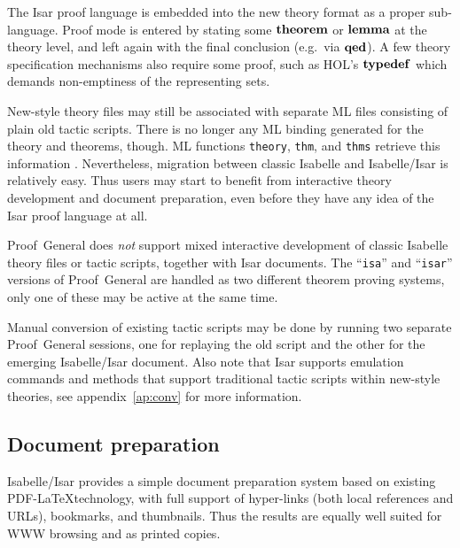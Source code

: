 The Isar proof language is embedded into the new theory format as a proper
sub-language.  Proof mode is entered by stating some ${\mathord{\mathbf{theorem}}}$ or
${\mathord{\mathbf{lemma}}}$ at the theory level, and left again with the final conclusion
(e.g.\ via ${\mathord{\mathbf{qed}}}$).  A few theory specification mechanisms also require
some proof, such as HOL's ${\mathord{\mathbf{typedef}}}$ which demands non-emptiness
of the representing sets.

New-style theory files may still be associated with separate ML files
consisting of plain old tactic scripts.  There is no longer any ML binding
generated for the theory and theorems, though.  ML functions \texttt{theory},
\texttt{thm}, and \texttt{thms} retrieve this information \cite{isabelle-ref}.
Nevertheless, migration between classic Isabelle and Isabelle/Isar is
relatively easy.  Thus users may start to benefit from interactive theory
development and document preparation, even before they have any idea of the
Isar proof language at all.

\begin{warn}
  Proof~General does \emph{not} support mixed interactive development of
  classic Isabelle theory files or tactic scripts, together with Isar
  documents.  The ``\texttt{isa}'' and ``\texttt{isar}'' versions of
  Proof~General are handled as two different theorem proving systems, only one
  of these may be active at the same time.
\end{warn}

Manual conversion of existing tactic scripts may be done by running two
separate Proof~General sessions, one for replaying the old script and the
other for the emerging Isabelle/Isar document.  Also note that Isar supports
emulation commands and methods that support traditional tactic scripts within
new-style theories, see appendix~\ref{ap:conv} for more information.


\subsection{Document preparation}\label{sec:document-prep}

Isabelle/Isar provides a simple document preparation system based on existing
PDF-\LaTeX technology, with full support of hyper-links (both local references
and URLs), bookmarks, and thumbnails.  Thus the results are equally well
suited for WWW browsing and as printed copies.

\medskip

